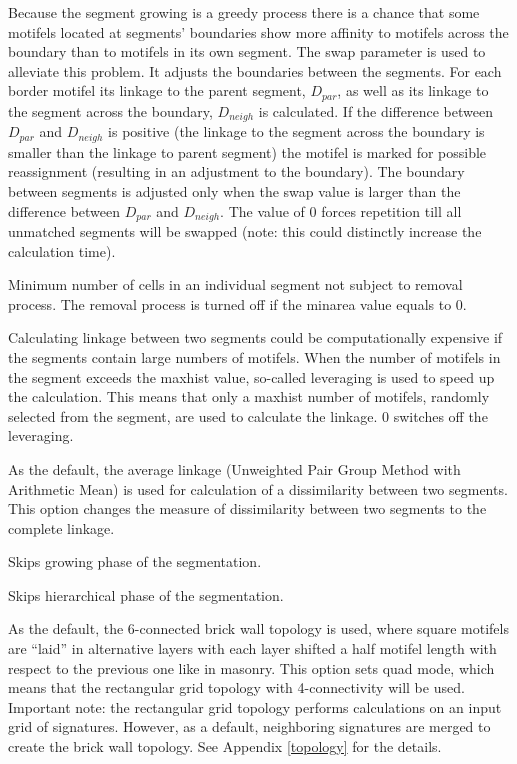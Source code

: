 
Because the segment growing is a greedy process there is a chance that some motifels located at segments’ boundaries show more affinity to motifels across the boundary than to motifels in its own segment.
The swap parameter is used to alleviate this problem.
It adjusts the boundaries between the segments.
For each border motifel its linkage to the parent segment, $D_{par}$, as well as its linkage to the segment across the boundary, $D_{neigh}$ is calculated.
If the difference between $D_{par}$ and $D_{neigh}$ is positive (the linkage to the segment across the boundary is smaller than the linkage to parent segment) the motifel is marked for possible reassignment (resulting in an adjustment to the boundary).
The boundary between segments is adjusted only when the swap value is larger than the difference between $D_{par}$ and $D_{neigh}$. 
The value of 0 forces repetition till all unmatched segments will be swapped (note: this could distinctly increase the calculation time).


Minimum number of cells in an individual segment not subject to removal process. 
The removal process is turned off if the minarea value equals to 0.


Calculating linkage between two segments could be computationally expensive if the segments contain large numbers of motifels.
When the number of motifels in the segment exceeds the maxhist value, so-called leveraging is used to speed up the calculation.
This means that only a maxhist number of motifels, randomly selected from the segment, are used to calculate the linkage.
0 switches off the leveraging.


As the default, the average linkage (Unweighted Pair Group Method with Arithmetic Mean) is used for calculation of a dissimilarity between two segments. 
This option changes the measure of dissimilarity between two segments to the complete linkage.


Skips growing phase of the segmentation.


Skips hierarchical phase of the segmentation.


As the default, the 6-connected brick wall topology is used, where square motifels are “laid” in alternative layers with each layer shifted a half motifel length with respect to the previous one like in masonry. 
This option sets quad mode, which means that the rectangular grid topology with 4-connectivity will be used. 
Important note: the rectangular grid topology performs calculations on an input grid of signatures. 
However, as a default, neighboring signatures are merged to create the brick wall topology.
See Appendix \ref{topology} for the details.

